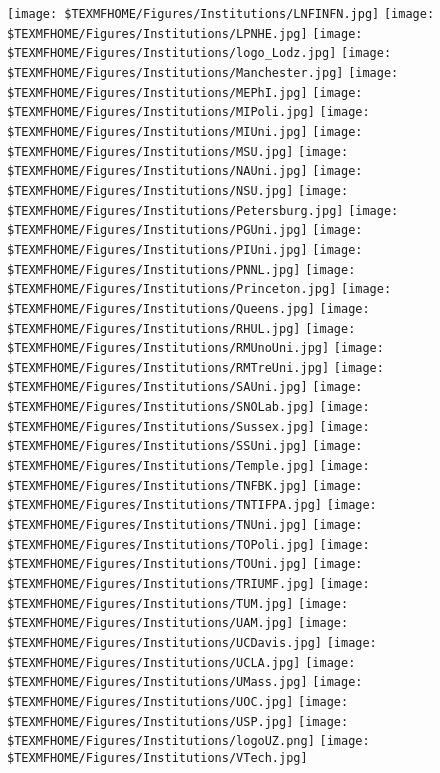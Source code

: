 \begin{center}
\texttt{[image: \$TEXMFHOME/Figures/Institutions/LNFINFN.jpg]}
\texttt{[image: \$TEXMFHOME/Figures/Institutions/LPNHE.jpg]}
\texttt{[image: \$TEXMFHOME/Figures/Institutions/logo\_Lodz.jpg]}
\texttt{[image: \$TEXMFHOME/Figures/Institutions/Manchester.jpg]}
\texttt{[image: \$TEXMFHOME/Figures/Institutions/MEPhI.jpg]}
\texttt{[image: \$TEXMFHOME/Figures/Institutions/MIPoli.jpg]}
\texttt{[image: \$TEXMFHOME/Figures/Institutions/MIUni.jpg]}
\texttt{[image: \$TEXMFHOME/Figures/Institutions/MSU.jpg]}
\texttt{[image: \$TEXMFHOME/Figures/Institutions/NAUni.jpg]}
\texttt{[image: \$TEXMFHOME/Figures/Institutions/NSU.jpg]}
\texttt{[image: \$TEXMFHOME/Figures/Institutions/Petersburg.jpg]}
\texttt{[image: \$TEXMFHOME/Figures/Institutions/PGUni.jpg]}
\texttt{[image: \$TEXMFHOME/Figures/Institutions/PIUni.jpg]}
\texttt{[image: \$TEXMFHOME/Figures/Institutions/PNNL.jpg]}
\texttt{[image: \$TEXMFHOME/Figures/Institutions/Princeton.jpg]}
\texttt{[image: \$TEXMFHOME/Figures/Institutions/Queens.jpg]}
\texttt{[image: \$TEXMFHOME/Figures/Institutions/RHUL.jpg]}
\texttt{[image: \$TEXMFHOME/Figures/Institutions/RMUnoUni.jpg]}
\texttt{[image: \$TEXMFHOME/Figures/Institutions/RMTreUni.jpg]}
\texttt{[image: \$TEXMFHOME/Figures/Institutions/SAUni.jpg]}
\texttt{[image: \$TEXMFHOME/Figures/Institutions/SNOLab.jpg]}
\texttt{[image: \$TEXMFHOME/Figures/Institutions/Sussex.jpg]}
\texttt{[image: \$TEXMFHOME/Figures/Institutions/SSUni.jpg]}
\texttt{[image: \$TEXMFHOME/Figures/Institutions/Temple.jpg]}
\texttt{[image: \$TEXMFHOME/Figures/Institutions/TNFBK.jpg]}
\texttt{[image: \$TEXMFHOME/Figures/Institutions/TNTIFPA.jpg]}
\texttt{[image: \$TEXMFHOME/Figures/Institutions/TNUni.jpg]}
\texttt{[image: \$TEXMFHOME/Figures/Institutions/TOPoli.jpg]}
\texttt{[image: \$TEXMFHOME/Figures/Institutions/TOUni.jpg]}
\texttt{[image: \$TEXMFHOME/Figures/Institutions/TRIUMF.jpg]}
\texttt{[image: \$TEXMFHOME/Figures/Institutions/TUM.jpg]}
\texttt{[image: \$TEXMFHOME/Figures/Institutions/UAM.jpg]}
\texttt{[image: \$TEXMFHOME/Figures/Institutions/UCDavis.jpg]}
\texttt{[image: \$TEXMFHOME/Figures/Institutions/UCLA.jpg]}
\texttt{[image: \$TEXMFHOME/Figures/Institutions/UMass.jpg]}
\texttt{[image: \$TEXMFHOME/Figures/Institutions/UOC.jpg]}
\texttt{[image: \$TEXMFHOME/Figures/Institutions/USP.jpg]}
\texttt{[image: \$TEXMFHOME/Figures/Institutions/logoUZ.png]}
\texttt{[image: \$TEXMFHOME/Figures/Institutions/VTech.jpg]}
\end{center}
%
